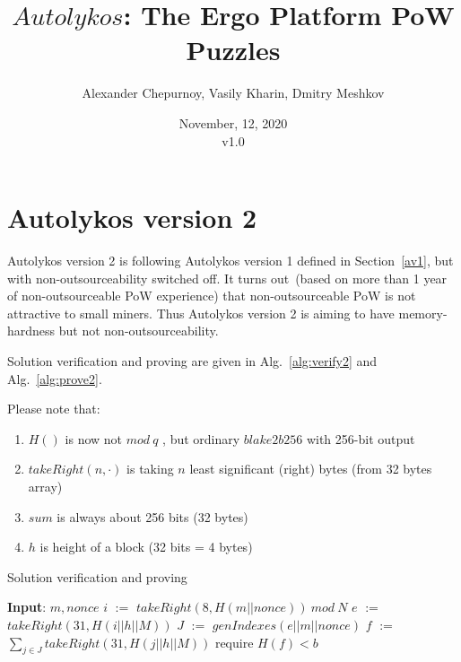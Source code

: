 \documentclass[]{article}
\newcommand{\Name}{$Autolykos$}
\def\Let#1#2{\State #1 $:=$ #2}
\begin{document}
    \title{\Name: The Ergo Platform PoW Puzzles}

    \author{Alexander Chepurnoy, Vasily Kharin, Dmitry Meshkov}

    \date{November, 12, 2020\\v1.0}
    \maketitle

    \section{Autolykos version 2}

    Autolykos version 2 is following Autolykos version 1 defined in Section~\ref{av1}, but with non-outsourceability 
    switched off. It turns out~(based on more than 1 year of non-outsourceable PoW experience) that non-outsourceable 
    PoW is not attractive to small miners. Thus Autolykos version 2 is aiming to have memory-hardness but not non-outsourceability.

    
    Solution verification and proving are given in Alg.~\ref{alg:verify2} and Alg.~\ref{alg:prove2}.

    Please note that:
    \begin{enumerate}
        \item{} $H()$ is now not $mod\ q$ , but ordinary $blake2b256$ with 256-bit output
        \item{} $takeRight(n, \cdot)$ is taking $n$ least significant (right) bytes (from 32 bytes array)
        \item{} $sum$ is always about 256 bits (32 bytes)
        \item{} $h$ is height of a block (32 bits = 4 bytes)
    \end{enumerate} 

    \begin{algorithm}[H]
        \caption{Solution verification and proving}
        \label{alg:verify2}
        \begin{algorithmic}[1]
            \State \textbf{Input}: $m, nonce$
            \Let{$i$}{$takeRight(8, H(m || nonce))\ mod\ N$}
            \Let{$e$}{$takeRight(31, H(i || h || M))$}
            \Let{$J$}{$genIndexes(e || m || nonce)$}
            \Let{$f$}{$\sum_{j \in J} takeRight(31, H(j || h || M))$}
            \State require $H(f) < b$
        \end{algorithmic}
    \end{algorithm}
\end{document}
